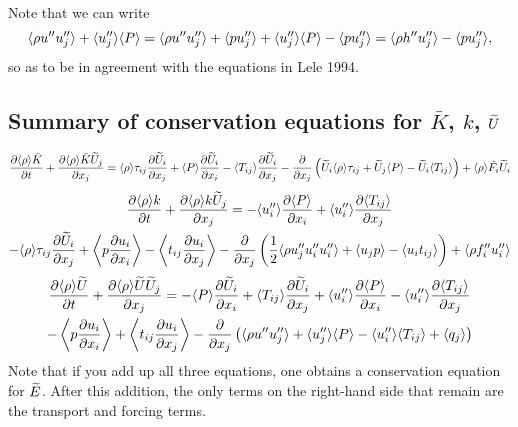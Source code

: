 \documentclass[oneside,a4paper,11pt]{report}
\begin{document}
Note that we can write
\begin{equation}
    \langle \rho u'' u_j'' \rangle + \langle u_j'' \rangle \langle P \rangle = \langle \rho u'' u_j'' \rangle + \langle p u_j'' \rangle + \langle u_j'' \rangle \langle P \rangle - \langle p u_j'' \rangle = \langle \rho h'' u_j'' \rangle - \langle p u_j'' \rangle,
\end{equation}
so as to be in agreement with the equations in Lele 1994.

\subsection{Summary of conservation equations for $\bar{K}$, $k$, $\widetilde{U}$}
\begin{equation}
\frac{ \partial \langle \rho \rangle \bar{K} }{ \partial t} + \frac{ \partial \langle \rho \rangle \bar{K} \widetilde{U}_j }{ \partial x_j} = \langle \rho \rangle \tau_{ij} \frac{ \partial \widetilde{U}_i }{ \partial x_j } + \langle P \rangle \frac{ \partial \widetilde{U}_i }{ \partial x_i } - \langle T_{ij} \rangle \frac{ \partial \widetilde{U}_i }{ \partial x_j } - \frac{\partial}{\partial x_j} \left ( \widetilde{U}_i \langle \rho \rangle \tau_{ij} + \widetilde{U}_j \langle P \rangle - \widetilde{U}_i \langle T_{ij} \rangle \right ) + \langle \rho \rangle \tilde{F}_i \widetilde{U}_i
\end{equation}
\begin{multline}
\frac{ \partial \langle \rho \rangle k }{ \partial t}  + \frac{ \partial \langle \rho \rangle k \widetilde{U}_j }{ \partial x_j } = - \langle u_i'' \rangle \frac{ \partial \langle P \rangle }{ \partial x_i } + \langle u_i'' \rangle \frac{ \partial \langle T_{ij} \rangle }{ \partial x_j } \\
- \langle \rho \rangle \tau_{ij} \frac{ \partial \widetilde{U}_i }{ \partial x_j}  + \left < p \frac{ \partial u_i } { \partial x_i } \right > - \left <  t_{ij} \frac{ \partial u_i }{ \partial x_j } \right > - \frac{\partial}{ \partial x_j} \left ( \frac{1}{2} \langle \rho u_j'' u_i'' u_i'' \rangle + \langle u_j p \rangle  - \langle u_i t_{ij} \rangle \right ) + \langle \rho f_i'' u_i'' \rangle
\end{multline}
\begin{multline}
    \frac{\partial \langle \rho \rangle \widetilde{U}}{\partial t} + \frac{\partial \langle \rho \rangle \widetilde{U} \widetilde{U}_j}{\partial x_j} = -\langle P \rangle \frac{\partial \widetilde{U}_i}{\partial x_i} + \langle T_{ij} \rangle \frac{\partial \widetilde{U}_i}{\partial x_j} +\langle u_i'' \rangle \frac{\partial \langle P \rangle}{\partial x_i} - \langle u_i'' \rangle \frac{\partial \langle T_{ij} \rangle}{\partial x_j} \\
    - \left < p \frac{\partial u_i}{\partial x_i} \right > + \left < t_{ij} \frac{\partial u_i}{\partial x_j} \right > - \frac{\partial}{\partial x_j} \left ( \langle \rho u'' u_j'' \rangle +  \langle u_j'' \rangle \langle P \rangle - \langle u_i'' \rangle \langle T_{ij} \rangle + \left < q_j \right > \right)
\end{multline}
Note that if you add up all three equations, one obtains a conservation equation for $\widetilde{E}$. After this addition, the only terms on the right-hand side that remain are the transport and forcing terms.
\end{document}

